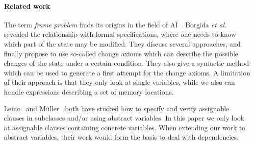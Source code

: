 \documentclass[a4paper]{llncs}
\newcommand{\jml}{\textsc{Jml}}
\newcommand{\escj}{\textsc{Esc/Java}}
\newcommand{\java}{\textsc{Java}}
\newcommand{\modtool}{\texttt{assignable:tool}}
\begin{document}

\paragraph{\bf{Related work}}
The term \emph{frame problem} finds its origins in the field of
AI~\cite{McCarthyH69}. Borgida \emph{et al.} revealed the relationship
with formal specifications, where one needs to know which part of the
state may be modified. They discuss several approaches, and finally
propose to use so-called change axioms which can describe the possible
changes of the state under a certain condition. They also give a
syntactic method which can be used to generate a first attempt for the
change axioms. A limitation of their approach is that they only look
at single variables, while we also can handle expressions describing a
set of memory locations.

Leino~\cite{Leino98} and M\"uller~\cite{Mueller01} both have studied
how to specify and verify assignable clauses in subclasses and/or
using abstract variables. In this paper we only look at assignable
clauses containing concrete variables. When extending our work to
abstract variables, their work would form the basis to deal with
dependencies. 
\end{document}
